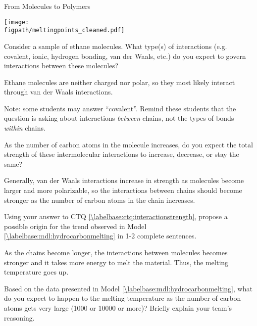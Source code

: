 \begin{activity}{From Molecules to Polymers}
\begin{model}
	\centerline{\texttt{[image: \\figpath/meltingpoints\_cleaned.pdf]}}
	
	\vspace{6pt}

\end{model}

\begin{ctqs}
	
	\question Consider a sample of ethane molecules.  What type(s) of interactions (e.g. covalent, ionic, hydrogen bonding, van der Waals, etc.) do you expect to govern interactions between these molecules?%
	
		\begin{solution}[0.5in]{}
			Ethane molecules are neither charged nor polar, so they most likely interact through van der Waals interactions.
			
			Note: some students may answer ``covalent''.  Remind these students that the question is asking about interactions \emph{between} chains, not the types of bonds \emph{within} chains.
		\end{solution}
	
	\question As the number of carbon atoms in the molecule increases, do you expect the total strength of these intermolecular interactions to increase, decrease, or stay the same? \label{\labelbase:ctq:interactionstrength}
	
		\begin{solution}[0.5in]{}
			Generally, van der Waals interactions increase in strength as molecules become larger and more polarizable, so the interactions between chains should become stronger as the number of carbon atoms in the chain increases.
		\end{solution}
	
	\question Using your answer to CTQ \ref{\labelbase:ctq:interactionstrength}, propose a possible origin for the trend observed in Model \ref{\labelbase:mdl:hydrocarbonmelting} in 1-2 complete sentences.
	
		\begin{solution}[1.9in]{}
			As the chains become longer, the interactions between molecules becomes stronger and it takes more energy to melt the material.  Thus, the melting temperature goes up.
		\end{solution}
	\question Based on the data presented in Model \ref{\labelbase:mdl:hydrocarbonmelting}, what do you expect to happen to the melting temperature as the number of carbon atoms gets very large (1000 or 10000 or more)?  Briefly explain your team's reasoning.
	

\end{ctqs}
\end{activity}
